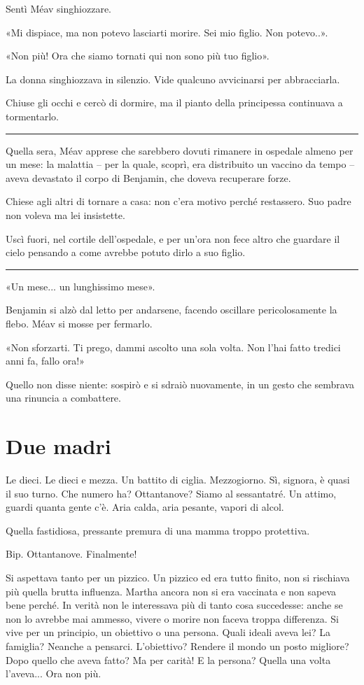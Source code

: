 \documentclass[a4paper,11pt,oneside,openright,final]{memoir}
\begin{document}
Sentì Méav singhiozzare.

«Mi dispiace, ma non potevo lasciarti morire. Sei mio figlio. Non potevo..».

«Non più! Ora che siamo tornati qui non sono più tuo figlio».

La donna singhiozzava in silenzio. Vide qualcuno avvicinarsi per abbracciarla.

Chiuse gli occhi e cercò di dormire, ma il pianto della principessa continuava
a tormentarlo.

\plainbreak{1}

Quella sera, Méav apprese che sarebbero dovuti rimanere in ospedale almeno per
un mese: la malattia -- per la quale, scoprì, era distribuito un vaccino da
tempo -- aveva devastato il corpo di Benjamin, che doveva recuperare forze.

Chiese agli altri di tornare a casa: non c'era motivo perché restassero. Suo
padre non voleva ma lei insistette.

Uscì fuori, nel cortile dell'ospedale, e per un'ora non fece altro che guardare
il cielo pensando a come avrebbe potuto dirlo a suo figlio.

\plainbreak{1}

«Un mese... un lunghissimo mese».

Benjamin si alzò dal letto per andarsene, facendo oscillare pericolosamente la
flebo. Méav si mosse per fermarlo.

«Non sforzarti. Ti prego, dammi ascolto una sola volta. Non l’hai fatto
tredici anni fa, fallo ora!»

Quello non disse niente: sospirò e si sdraiò nuovamente, in un gesto che
sembrava una rinuncia a combattere.

\chapter{Due madri}

Le dieci. Le dieci e mezza. Un battito di ciglia. Mezzogiorno. Sì, signora, è
quasi il suo turno. Che numero ha? Ottantanove? Siamo al sessantatré. Un
attimo, guardi quanta gente c’è. Aria calda, aria pesante, vapori di alcol.

Quella fastidiosa, pressante premura di una mamma troppo protettiva.

Bip. Ottantanove. Finalmente!

Si aspettava tanto per un pizzico. Un pizzico ed era tutto finito, non si
rischiava più quella brutta influenza. Martha ancora non si era vaccinata e non
sapeva bene perché. In verità non le interessava più di tanto cosa
succedesse: anche se non lo avrebbe mai ammesso, vivere o morire non faceva
troppa differenza. Si vive per un principio, un obiettivo o una persona. Quali
ideali aveva lei? La famiglia? Neanche a pensarci. L’obiettivo? Rendere il
mondo un posto migliore? Dopo quello che aveva fatto? Ma per carità! E la
persona? Quella una volta l’aveva... Ora non più.
\end{document}
